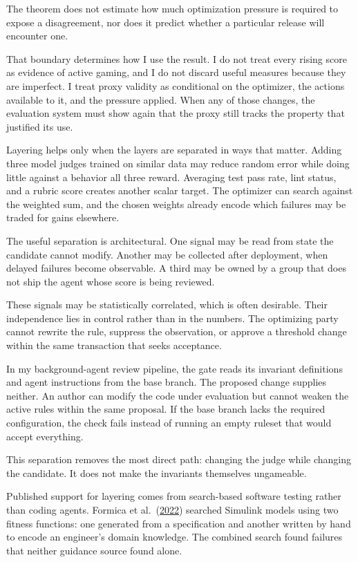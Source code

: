 The theorem does not estimate how much optimization pressure is required to expose a disagreement, nor does it predict whether a particular release will encounter one.

That boundary determines how I use the result. I do not treat every rising score as evidence of active gaming, and I do not discard useful measures because they are imperfect. I treat proxy validity as conditional on the optimizer, the actions available to it, and the pressure applied. When any of those changes, the evaluation system must show again that the proxy still tracks the property that justified its use.

Layering helps only when the layers are separated in ways that matter. Adding three model judges trained on similar data may reduce random error while doing little against a behavior all three reward. Averaging test pass rate, lint status, and a rubric score creates another scalar target. The optimizer can search against the weighted sum, and the chosen weights already encode which failures may be traded for gains elsewhere.

The useful separation is architectural. One signal may be read from state the candidate cannot modify. Another may be collected after deployment, when delayed failures become observable. A third may be owned by a group that does not ship the agent whose score is being reviewed.

These signals may be statistically correlated, which is often desirable. Their independence lies in control rather than in the numbers. The optimizing party cannot rewrite the rule, suppress the observation, or approve a threshold change within the same transaction that seeks acceptance.

In my background-agent review pipeline, the gate reads its invariant definitions and agent instructions from the base branch. The proposed change supplies neither. An author can modify the code under evaluation but cannot weaken the active rules within the same proposal. If the base branch lacks the required configuration, the check fails instead of running an empty ruleset that would accept everything.

This separation removes the most direct path: changing the judge while changing the candidate. It does not make the invariants themselves ungameable.

Published support for layering comes from search-based software testing rather than coding agents. Formica et al.~(\href{https://arxiv.org/abs/2207.11016}{2022}) searched Simulink models using two fitness functions: one generated from a specification and another written by hand to encode an engineer's domain knowledge. The combined search found failures that neither guidance source found alone.

